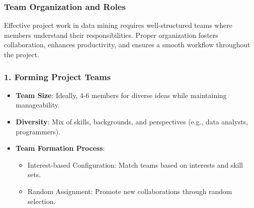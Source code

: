 \documentclass{beamer}
\begin{document}
\begin{frame}[fragile]
    \frametitle{Team Organization and Roles}
    Effective project work in data mining requires well-structured teams where members understand their responsibilities. 
    Proper organization fosters collaboration, enhances productivity, and ensures a smooth workflow throughout the project.
\end{frame}

\begin{frame}[fragile]
    \frametitle{1. Forming Project Teams}
    \begin{itemize}
        \item \textbf{Team Size}: Ideally, 4-6 members for diverse ideas while maintaining manageability.
        \item \textbf{Diversity}: Mix of skills, backgrounds, and perspectives (e.g., data analysts, programmers).
        \item \textbf{Team Formation Process}:
        \begin{itemize}
            \item Interest-based Configuration: Match teams based on interests and skill sets.
            \item Random Assignment: Promote new collaborations through random selection.
        \end{itemize}
    \end{itemize}
\end{frame}
\end{document}
